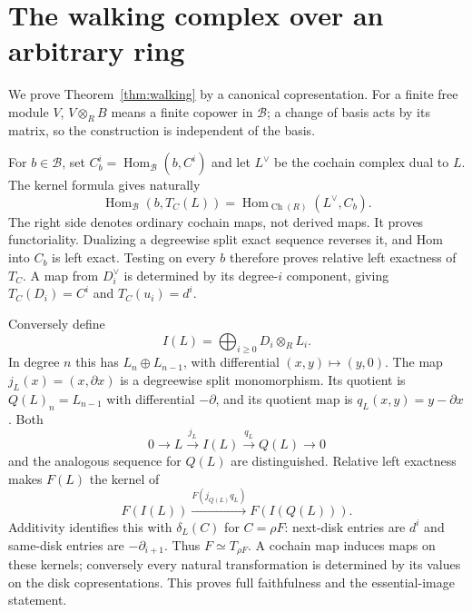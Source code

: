 \documentclass[11pt,a4paper]{article}
\theoremstyle{definition}
\newcommand{\Hom}{\operatorname{Hom}}
\begin{document}
\section{The walking complex over an arbitrary ring}\label{sec:walking}
We prove Theorem~\ref{thm:walking} by a canonical copresentation. For a finite free module $V$, $V\otimes_R B$ means a finite copower in $\mathcal B$; a change of basis acts by its matrix, so the construction is independent of the basis.

For $b\in\mathcal B$, set $C_b^i=\Hom_{\mathcal B}(b,C^i)$ and let $L^\vee$ be the cochain complex dual to $L$. The kernel formula gives naturally
\[
 \Hom_{\mathcal B}(b,T_C(L))
 =\Hom_{\operatorname{Ch}(R)}(L^\vee,C_b).
\]
The right side denotes ordinary cochain maps, not derived maps. It proves functoriality. Dualizing a degreewise split exact sequence reverses it, and Hom into $C_b$ is left exact. Testing on every $b$ therefore proves relative left exactness of $T_C$. A map from $D_i^\vee$ is determined by its degree-$i$ component, giving $T_C(D_i)=C^i$ and $T_C(u_i)=d^i$.

Conversely define
\[
 I(L)=\bigoplus_{i\ge0}D_i\otimes_RL_i.
\]
In degree $n$ this has $L_n\oplus L_{n-1}$, with differential $(x,y)\mapsto(y,0)$. The map $j_L(x)=(x,\partial x)$ is a degreewise split monomorphism. Its quotient is $Q(L)_n=L_{n-1}$ with differential $-\partial$, and its quotient map is $q_L(x,y)=y-\partial x$. Both
\[
 0\to L\xrightarrow{j_L}I(L)\xrightarrow{q_L}Q(L)\to0
\]
and the analogous sequence for $Q(L)$ are distinguished. Relative left exactness makes $F(L)$ the kernel of
\[
 F(I(L))\xrightarrow{F(j_{Q(L)}q_L)}F(I(Q(L))).
\]
Additivity identifies this with $\delta_L(C)$ for $C=\rho F$: next-disk entries are $d^i$ and same-disk entries are $-\partial_{i+1}$. Thus $F\simeq T_{\rho F}$. A cochain map induces maps on these kernels; conversely every natural transformation is determined by its values on the disk copresentations. This proves full faithfulness and the essential-image statement.
\end{document}
